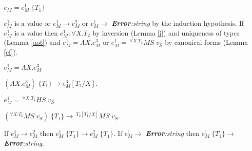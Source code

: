 \begin{case}
$e_{M}=e_{M}^{1}\;\lbrace T_{1}\rbrace$

$e_{M}^{1}$ is a value or $e_{M}^{1}\rightarrow e_{M}^{2}$ or $e_{M}^{1}\rightarrow$ \emph{\textbf{Error}:\;string} by the induction hypothesis.  If $e_{M}^{1}$ is a value then $e_{M}^{1}:\forall X.T_{2}$ by inversion (Lemma \ref{i}) and uniqueness of types (Lemma \ref{uot}) and $e_{M}^{1}=\Lambda X.e_{M}^{3}$ or $e_{M}^{1}=\,^{\forall X.T_{2}}MS\;v_{S}$ by canonical forms (Lemma \ref{cf}).
\begin{subcase}
$e_{M}^{1}=\Lambda X.e_{M}^{3}$

$(\Lambda X.e_{M}^{3})\;\lbrace T_{1}\rbrace\rightarrow e_{M}^{3}[T_{1}/X]$.
\end{subcase}
\begin{subcase}
$e_{M}^{1}=\,^{\forall X.T_{2}}HS\;v_{S}$

$(^{\forall X.T_{2}}MS\;v_{S})\;\lbrace T_{1}\rbrace\rightarrow\,^{T_{2}[T_{1}^{a}/X]}MS\;v_{S}$.
\end{subcase}
If $e_{M}^{1}\rightarrow e_{M}^{2}$ then $e_{M}^{1}\;\lbrace T_{1}\rbrace\rightarrow e_{M}^{2}\;\lbrace T_{1}\rbrace$.  If $e_{M}^{1}\rightarrow$ \emph{\textbf{Error}:\;string} then $e_{M}^{1}\;\lbrace T_{1}\rbrace\rightarrow$ \emph{\textbf{Error}:\;string}.
\end{case}